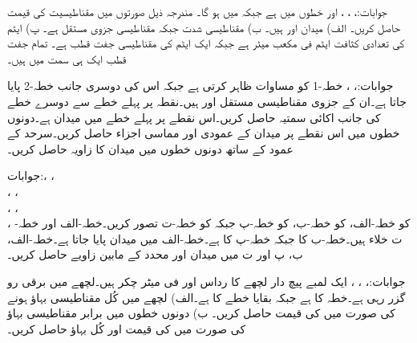 جوابات:، ، ،  اور  خطوں میں  ہے جبکہ  میں  ہو گا۔
مندرجہ ذیل صورتوں میں مقناطیسیت  کی قیمت  حاصل کریں۔ الف) میدان  اور  ہیں۔ ب) مقناطیسی 
شدت  جبکہ مقناطیسی جزوی مستقل  ہے۔ پ) ایٹم کی تعدادی کثافت  ایٹم فی مکعب میٹر ہے جبکہ ایک ایٹم کی مقناطیسی جفت قطب  ہے۔ تمام جفت قطب ایک ہی سمت میں ہیں۔

جوابات:، ، 
خطہ-1 کو مساوات  ظاہر کرتی ہے جبکہ اس کی دوسری جانب خطہ-2 پایا جاتا ہے۔ان کے جزوی مقناطیسی مستقل  اور  ہیں۔نقطہ  پر پہلے خطے سے دوسرے خطے کی جانب اکائی سمتیہ حاصل کریں۔اس نقطے پر پہلے خطے میں میدان
  ہے۔دونوں خطوں میں اس نقطے پر میدان کے عمودی اور مماسی اجزاء حاصل کریں۔سرحد کے عمود کے ساتھ دونوں خطوں میں میدان کا زاویہ حاصل کریں۔

جوابات:، ، \\ 
 ، ، \\
 ، ، \\
،  
 کو خطہ-الف،  کو خطہ-ب،  کو خطہ-پ جبکہ  کو خطہ-ت تصور کریں۔خطہ-الف اور خطہ-ت خلاء ہیں۔خطہ-ب کا   جبکہ خطہ-پ کا  ہے۔خطہ-الف میں میدان  پایا جاتا ہے۔خطہ-الف، ب، پ اور ت میں میدان اور  محدد کے مابین زاویے حاصل کریں۔

جوابات:، ، ، 
ایک لمبے پیچ دار لچھے کا رداس  اور فی میٹر چکر  ہیں۔لچھے میں  برقی رو گزر رہی ہے۔خطہ  کا  ہے جبکہ بقایا خطے  کا  ہے۔الف) لچھے میں کُل مقناطیسی بہاؤ  ہونے کی صورت میں  کی قیمت حاصل کریں۔ ب) دونوں خطوں میں برابر مقناطیسی بہاؤ کی صورت میں  کی قیمت اور کُل بہاؤ حاصل کریں۔ 

